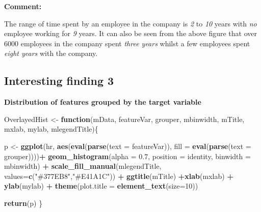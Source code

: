 \documentclass[
  11pt,
]{article}
\newenvironment{Shaded}{\begin{snugshade}}{\end{snugshade}}
\newcommand{\AttributeTok}[1]{\textcolor[rgb]{0.13,0.29,0.53}{#1}}
\newcommand{\ControlFlowTok}[1]{\textcolor[rgb]{0.13,0.29,0.53}{\textbf{#1}}}
\newcommand{\DecValTok}[1]{\textcolor[rgb]{0.00,0.00,0.81}{#1}}
\newcommand{\FloatTok}[1]{\textcolor[rgb]{0.00,0.00,0.81}{#1}}
\newcommand{\FunctionTok}[1]{\textcolor[rgb]{0.13,0.29,0.53}{\textbf{#1}}}
\newcommand{\NormalTok}[1]{#1}
\newcommand{\OtherTok}[1]{\textcolor[rgb]{0.56,0.35,0.01}{#1}}
\newcommand{\SpecialCharTok}[1]{\textcolor[rgb]{0.81,0.36,0.00}{\textbf{#1}}}
\newcommand{\StringTok}[1]{\textcolor[rgb]{0.31,0.60,0.02}{#1}}
\begin{document}
\hfill\break
\textbf{Comment:}

The range of time spent by an employee in the company is \emph{2} to
\emph{10} years with \emph{no} employee working for \emph{9} years. It
can also be seen from the above figure that over 6000 employees in the
company spent \emph{three years} whilst a few employees spent
\emph{eight years} with the company.

\hfill\break

\subsection{Interesting finding 3}

\textbf{Distribution of features grouped by the target variable}

\begin{Shaded}
\begin{Highlighting}[]
\NormalTok{OverlayedHist }\OtherTok{\textless{}{-}} \ControlFlowTok{function}\NormalTok{(mData, featureVar, grouper, mbinwidth, mTitle,  mxlab,}
\NormalTok{                          mylab, mlegendTitle)\{}
  
\NormalTok{  p }\OtherTok{\textless{}{-}} \FunctionTok{ggplot}\NormalTok{(hr, }\FunctionTok{aes}\NormalTok{(}\FunctionTok{eval}\NormalTok{(}\FunctionTok{parse}\NormalTok{(}\AttributeTok{text =}\NormalTok{ featureVar)), }\AttributeTok{fill =} \FunctionTok{eval}\NormalTok{(}\FunctionTok{parse}\NormalTok{(}\AttributeTok{text =}\NormalTok{ grouper))))}\SpecialCharTok{+}
    \FunctionTok{geom\_histogram}\NormalTok{(}\AttributeTok{alpha =} \FloatTok{0.7}\NormalTok{, }\AttributeTok{position =} \StringTok{\textquotesingle{}identity\textquotesingle{}}\NormalTok{, }\AttributeTok{binwidth =}\NormalTok{ mbinwidth) }\SpecialCharTok{+} 
    \FunctionTok{scale\_fill\_manual}\NormalTok{(mlegendTitle, }\AttributeTok{values=}\FunctionTok{c}\NormalTok{(}\StringTok{"\#377EB8"}\NormalTok{,}\StringTok{"\#E41A1C"}\NormalTok{)) }\SpecialCharTok{+} 
    \FunctionTok{ggtitle}\NormalTok{(mTitle) }\SpecialCharTok{+}\FunctionTok{xlab}\NormalTok{(mxlab) }\SpecialCharTok{+} \FunctionTok{ylab}\NormalTok{(mylab) }\SpecialCharTok{+} 
    \FunctionTok{theme}\NormalTok{(}\AttributeTok{plot.title =} \FunctionTok{element\_text}\NormalTok{(}\AttributeTok{size=}\DecValTok{10}\NormalTok{))}

  
  \FunctionTok{return}\NormalTok{(p)}
\NormalTok{\}}
\end{Highlighting}
\end{Shaded}
\end{document}
